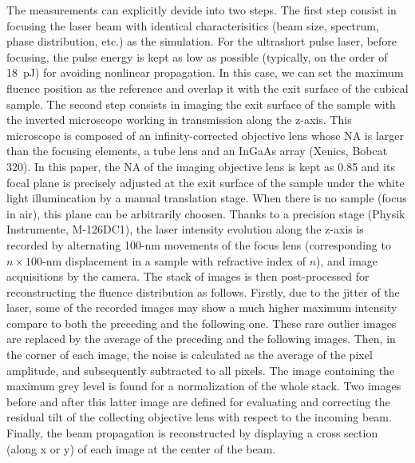 \documentclass[9pt,twocolumn,twoside]{osajnl}
\begin{document}
The measurements can explicitly devide into two steps. The first step consist in focusing the laser beam with identical characterisitics (beam size, spectrum, phase distribution, etc.) as the simulation. For the ultrashort pulse laser, before focusing, the pulse energy is kept as low as possible (typically, on the order of 18~pJ) for avoiding nonlinear propagation. In this case, we can set the maximum fluence position as the reference and overlap it with the exit surface of the cubical sample. The second step consists in imaging the exit surface of the sample with the inverted microscope working in transmission along the z-axis. This microscope is composed of an infinity-corrected objective lens whose NA is larger than the focusing elements, a tube lens and an InGaAs array (Xenics, Bobcat 320). In this paper, the NA of the imaging objective lens is kept as 0.85 and its focal plane is precisely adjusted at the exit surface of the sample under the white light illumincation by a manual translation stage. When there is no sample (focus in air), this plane can be arbitrarily choosen. Thanks to a precision stage (Physik Instrumente, M-126DC1), the laser intensity evolution along the z-axis is recorded by alternating 100-nm movements of the focus lens (corresponding to $n\times100$-nm displacement in a sample with refractive index of $n$), and image acquisitions by the camera. The stack of images is then post-processed for reconstructing the fluence distribution as follows. Firstly, due to the jitter of the laser, some of the recorded images may show a much higher maximum intensity compare to both the preceding and the following one. These rare outlier images are replaced by the average of the preceding and the following images. Then, in the corner of each image, the noise is calculated as the average of the pixel amplitude, and subsequently subtracted to all pixels. The image containing the maximum grey level is found for a normalization of the whole stack. Two images before and after this latter image are defined for evaluating and correcting the residual tilt of the collecting objective lens with respect to the incoming beam. Finally, the beam propagation is reconstructed by displaying a cross section (along x or y) of each image at the center of the beam. 
\end{document}
